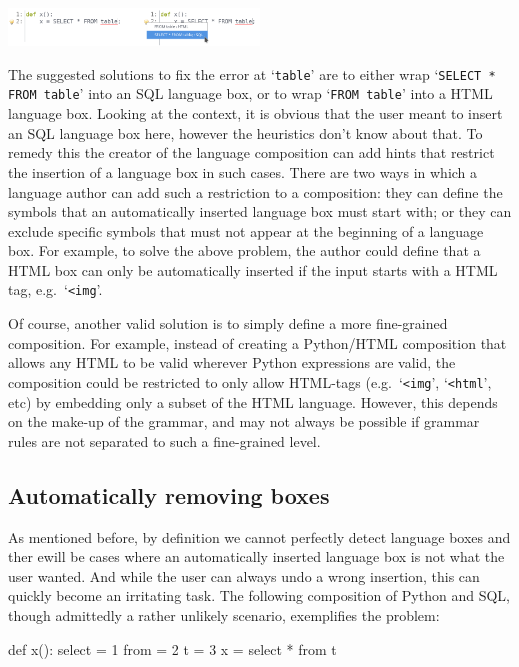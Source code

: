 \documentclass[sigplan,screen]{acmart}\settopmatter{printfolios=true,printccs=false,printacmref=false}
\newcommand{\qtt}[1]{`\texttt{#1}'\xspace}
\begin{document}
\begin{center}
\includegraphics[width=0.5\textwidth]{images/auto_html.png}
\end{center}

The suggested solutions to fix the error at \qtt{table} are to either wrap
\qtt{SELECT * FROM table} into an SQL language box, or to wrap
\qtt{FROM table} into a HTML language box. Looking at the context, it is obvious
that the user meant to insert an SQL language box here, however the heuristics don't
know about that. To remedy this the creator of the language composition can add hints that
restrict the insertion of a language box in such cases. There are two ways in which
a language author can add such a restriction to a composition: they can define
the symbols that an automatically inserted language box must start with;
or they can exclude specific symbols that must not appear at the beginning of a
language box. For example, to solve the above problem, the author could define
that a HTML box can only be automatically inserted if the input starts with a HTML tag,
e.g.~\qtt{<img}.

Of course, another valid solution is to simply define a more
fine-grained composition. For example, instead of creating a Python/HTML
composition that allows any HTML to be valid wherever Python expressions are
valid, the composition could be restricted to only allow HTML-tags
(e.g.~\qtt{<img}, \qtt{<html}, etc) by embedding only a subset of the HTML
language. However, this depends on the make-up of the grammar, and may not
always be possible if grammar rules are not separated to such a fine-grained
level.

\subsection{Automatically removing boxes}
\label{subsec_autoremoval}

As mentioned before, by definition we cannot perfectly detect language boxes
and ther ewill be cases where an automatically inserted language box is not
what the user wanted.
And while the user can always undo a wrong insertion,
this can quickly become an irritating task.
The following composition of Python and
SQL, though admittedly a rather unlikely scenario, exemplifies the problem:

\begin{lstdefault}[language=Python]
  def x():
    select = 1
    from = 2
    t = 3
    x = select * from t
\end{lstdefault}
\vspace{1em}
\end{document}
